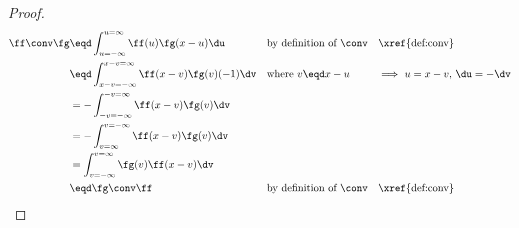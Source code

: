 \begin{proof}
\begin{align*}
  \ff\conv\fg
    &\eqd \int_{u=-\infty}^{u=\infty} \ff(u)\fg(x-u) \du
    && \text{by definition of $\conv$}
    && \text{\xref{def:conv}}
  \\&\eqd \int_{x-v=-\infty}^{x-v=\infty} \ff(x-v)\fg(v) (-1)\dv
    && \text{where $v\eqd x-u$}
    && \text{$\implies$ $u=x-v$, $\du=-\dv$}
  \\&= -\int_{-v=-\infty}^{-v=\infty} \ff(x-v)\fg(v) \dv
  \\&= -\int_{v=\infty}^{v=-\infty} \ff(x-v)\fg(v) \dv
  \\&= \int^{v=\infty}_{v=-\infty} \fg(v)\ff(x-v) \dv
  \\&\eqd \fg\conv\ff
    && \text{by definition of $\conv$}
    && \text{\xref{def:conv}}
\end{align*}
\end{proof}

